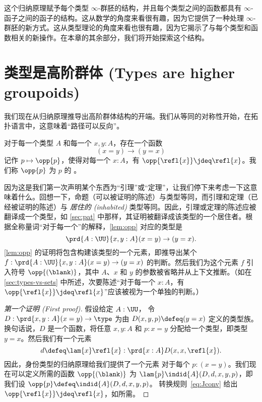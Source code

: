 这个归纳原理赋予每个类型 $\infty$-群胚的结构，并且每个类型之间的函数都具有 $\infty$-函子之间的函子的结构。这从数学的角度来看很有趣，因为它提供了一种处理 $\infty$-群胚的新方式。这从类型理论的角度来看也很有趣，因为它揭示了与每个类型和函数相关的新操作。在本章的其余部分，我们将开始探索这个结构。

\section{类型是高阶群体 (Types are higher groupoids)}
\label{sec:equality}

%
%
%
我们现在从归纳原理推导出高阶群体结构的开端。我们从等同的对称性开始，在拓扑语言中，这意味着“路径可以反向”。

\begin{lem}\label{lem:opp}
对于每一个类型 $A$ 和每一个 $x,y:A$，存在一个函数
\begin{equation*}
(x= y)\to(y= x)
\end{equation*}
记作 $p\mapsto \opp{p}$，使得对每一个 $x:A$，有 $\opp{\refl{x}}\jdeq\refl{x}$。我们称 $\opp{p}$ 为 $p$ 的 。
%
%
%
\end{lem}

因为这是我们第一次声明某个东西为“引理”或“定理”，让我们停下来考虑一下这意味着什么。回想一下，命题（可以被证明的陈述）与类型等同，而引理和定理（已经被证明的陈述）与 \emph{居住的 (inhabited)} 类型等同。因此，引理或定理的陈述应被翻译成一个类型，如 \cref{sec:pat} 中那样，其证明被翻译成该类型的一个居住者。根据全称量词“对于每一个”的解释，\cref{lem:opp} 对应的类型是
\[ \prd{A:\UU}{x,y:A} (x= y)\to(y= x). \]
\cref{lem:opp} 的证明将包含构建该类型的一个元素，即推导出某个 $f:\prd{A:\UU}{x,y:A} (x= y)\to(y= x)$ 的判断。然后我们为这个元素 $f$ 引入符号 $\opp{(\blank)}$，其中 $A$、$x$ 和 $y$ 的参数被省略并从上下文推断。（如在 \cref{sec:types-vs-sets} 中所述，次要陈述“对于每一个 $x:A$，有 $\opp{\refl{x}}\jdeq\refl{x}$”应该被视为一个单独的判断。）

\begin{proof}[第一个证明 (First proof)]
  假设给定 $A:\UU$，
  令 $D:\prd{x,y:A}(x= y) \to \type$ 为由 $D(x,y,p)\defeq (y= x)$ 定义的类型族。换句话说，$D$ 是一个函数，将任意 $x,y:A$ 和 $p:x=y$ 分配给一个类型，即类型 $y=x$。然后我们有一个元素
  \begin{equation*}
    d\defeq \lam{x} \refl{x}:\prd{x:A} D(x,x,\refl{x}).
  \end{equation*}
  因此，身份类型的归纳原理给我们提供了一个元素
  对于每个 $p:(x= y)$。我们现在可以定义所需的函数 $\opp{(\blank)}$ 为 $\lam{p} \indid{A}(D,d,x,y,p)$，即我们设 $\opp{p} \defeq \indid{A}(D,d,x,y,p)$。
  转换规则~\eqref{eq:Jconv} 给出 $\opp{\refl{x}}\jdeq \refl{x}$，如所需。
\end{proof}

